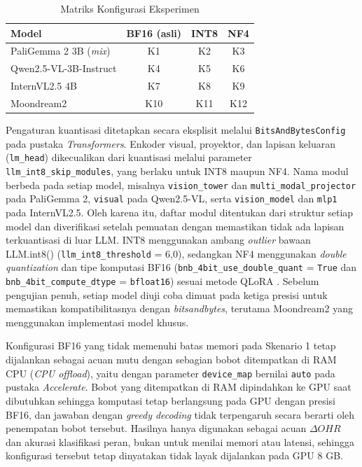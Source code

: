 \begin{table}[htbp]
    \centering
    \caption{Matriks Konfigurasi Eksperimen}
    \label{tab:konfigurasi}
    \renewcommand{\arraystretch}{1.3}
    \begin{tabular}{|p{3.6cm}|c|c|c|}
    \hline
    \textbf{Model} & \textbf{BF16 (asli)} & \textbf{INT8} & \textbf{NF4} \\
    \hline
    PaliGemma 2 3B (\textit{mix}) & K1 & K2 & K3 \\
    \hline
    Qwen2.5-VL-3B-Instruct & K4 & K5 & K6 \\
    \hline
    InternVL2.5 4B & K7 & K8 & K9 \\
    \hline
    Moondream2 & K10 & K11 & K12 \\
    \hline
    \end{tabular}
\end{table}

Pengaturan kuantisasi ditetapkan secara eksplisit melalui \texttt{BitsAndBytesConfig} pada pustaka \textit{Transformers}. Enkoder visual, proyektor, dan lapisan keluaran (\texttt{lm\_head}) dikecualikan dari kuantisasi melalui parameter \texttt{llm\_int8\_skip\_modules}, yang berlaku untuk INT8 maupun NF4. Nama modul berbeda pada setiap model, misalnya \texttt{vision\_tower} dan \texttt{multi\_modal\_projector} pada PaliGemma 2, \texttt{visual} pada Qwen2.5-VL, serta \texttt{vision\_model} dan \texttt{mlp1} pada InternVL2.5. Oleh karena itu, daftar modul ditentukan dari struktur setiap model dan diverifikasi setelah pemuatan dengan memastikan tidak ada lapisan terkuantisasi di luar LLM. INT8 menggunakan ambang \textit{outlier} bawaan LLM.int8() (\texttt{llm\_int8\_threshold} = 6,0), sedangkan NF4 menggunakan \textit{double quantization} dan tipe komputasi BF16 (\texttt{bnb\_4bit\_use\_double\_quant} = \texttt{True} dan \texttt{bnb\_4bit\_compute\_dtype} = \texttt{bfloat16}) sesuai metode QLoRA \cite{ref35}. Sebelum pengujian penuh, setiap model diuji coba dimuat pada ketiga presisi untuk memastikan kompatibilitasnya dengan \textit{bitsandbytes}, terutama Moondream2 yang menggunakan implementasi model khusus.

Konfigurasi BF16 yang tidak memenuhi batas memori pada Skenario 1 tetap dijalankan sebagai acuan mutu dengan sebagian bobot ditempatkan di RAM CPU (\textit{CPU offload}), yaitu dengan parameter \texttt{device\_map} bernilai \texttt{auto} pada pustaka \textit{Accelerate}. Bobot yang ditempatkan di RAM dipindahkan ke GPU saat dibutuhkan sehingga komputasi tetap berlangsung pada GPU dengan presisi BF16, dan jawaban dengan \textit{greedy decoding} tidak terpengaruh secara berarti oleh penempatan bobot tersebut. Hasilnya hanya digunakan sebagai acuan $\Delta OHR$ dan akurasi klasifikasi peran, bukan untuk menilai memori atau latensi, sehingga konfigurasi tersebut tetap dinyatakan tidak layak dijalankan pada GPU 8 GB.

